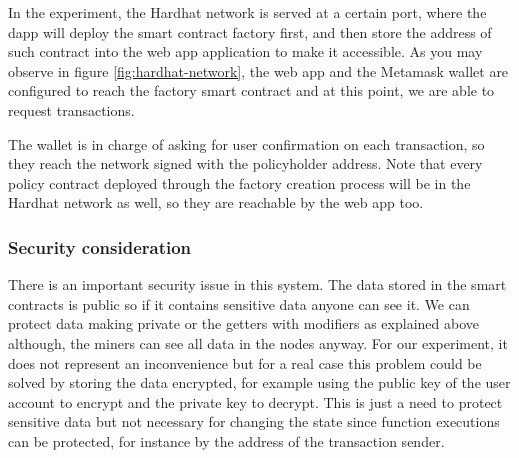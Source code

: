 {In the experiment, the Hardhat network is served at a certain port, where the dapp will deploy the smart contract factory first, and then store the address of such contract into the web app application to make it accessible. As you may observe in figure \ref{fig:hardhat-network}, the web app and the Metamask wallet are configured to reach the factory smart contract and at this point, we are able to request transactions. 

The wallet is in charge of asking for user confirmation on each transaction, so they reach the network signed with the policyholder address. Note that every policy contract deployed through the factory creation process will be in the Hardhat network as well, so they are reachable by the web app too. 

}

\subsubsection{Security consideration}
{
There is an important security issue in this system. The data stored in the smart contracts is public so if it contains sensitive data anyone can see it. We can protect data making private or the getters with modifiers as explained above although, the miners can see all data in the nodes anyway. For our experiment, it does not represent an inconvenience but for a real case this problem could be solved by storing the data encrypted, for example using the public key of the user account to encrypt and the private key to decrypt. This is just a need to protect sensitive data but not necessary for changing the state since function executions can be protected, for instance by the address of the transaction sender.
}


